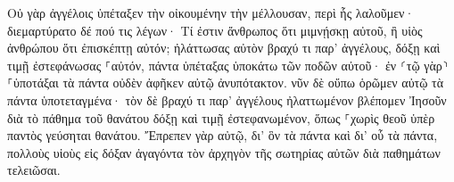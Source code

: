 \documentclass{openreader}
\begin{document}
Οὐ γὰρ ἀγγέλοις ὑπέταξεν τὴν οἰκουμένην τὴν μέλλουσαν, περὶ ἧς λαλοῦμεν· 
διεμαρτύρατο δέ πού τις λέγων· Τί ἐστιν ἄνθρωπος ὅτι μιμνῄσκῃ αὐτοῦ, ἢ υἱὸς ἀνθρώπου ὅτι ἐπισκέπτῃ αὐτόν; 
ἠλάττωσας αὐτὸν βραχύ τι παρ’ ἀγγέλους, δόξῃ καὶ τιμῇ ἐστεφάνωσας ⸀αὐτόν, 
πάντα ὑπέταξας ὑποκάτω τῶν ποδῶν αὐτοῦ· ἐν ⸂τῷ γὰρ⸃ ⸀ὑποτάξαι τὰ πάντα οὐδὲν ἀφῆκεν αὐτῷ ἀνυπότακτον. νῦν δὲ οὔπω ὁρῶμεν αὐτῷ τὰ πάντα ὑποτεταγμένα· 
τὸν δὲ βραχύ τι παρ’ ἀγγέλους ἠλαττωμένον βλέπομεν Ἰησοῦν διὰ τὸ πάθημα τοῦ θανάτου δόξῃ καὶ τιμῇ ἐστεφανωμένον, ὅπως ⸀χωρὶς θεοῦ ὑπὲρ παντὸς γεύσηται θανάτου. 
Ἔπρεπεν γὰρ αὐτῷ, δι’ ὃν τὰ πάντα καὶ δι’ οὗ τὰ πάντα, πολλοὺς υἱοὺς εἰς δόξαν ἀγαγόντα τὸν ἀρχηγὸν τῆς σωτηρίας αὐτῶν διὰ παθημάτων τελειῶσαι. 
\end{document}
